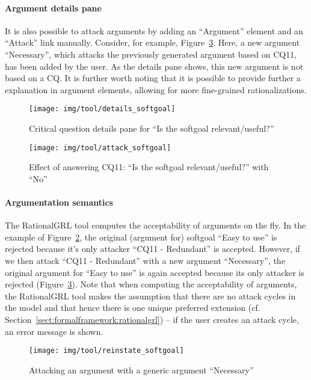 \paragraph{Argument details pane} It is also possible to attack arguments by adding an ``Argument'' element and an ``Attack'' link manually. Consider, for example, Figure~\ref{fig:tool:argument}. Here, a new argument ``Necessary'', which attacks the previously generated argument based on CQ11, has been added by the user. As the details pane shows, this new argument is not based on a CQ. It is further worth noting that it is possible to provide further a explanation in argument elements, allowing for more fine-grained rationalizations. 

\begin{figure}[t]
\centering
\texttt{[image: img/tool/details\_softgoal]}
\caption{Critical question details pane for ``Is the softgoal relevant/useful?''}
\label{fig:tool:cqdetails}
\end{figure}

\begin{figure}[b]
\centering
\texttt{[image: img/tool/attack\_softgoal]}
\caption{Effect of answering CQ11: ``Is the softgoal relevant/useful?'' with ``No''}
\label{fig:tool:cqeffect}
\end{figure}

\paragraph{Argumentation semantics} The RationalGRL tool computes the acceptability of arguments on the fly. In the example of Figure~\ref{fig:tool:cqeffect}, the original (argument for) softgoal ``Easy to use'' is rejected because it's only attacker ``CQ11 - Redundant'' is accepted. However, if we then attack ``CQ11 - Redundant'' with a new argument ``Necessary'', the original argument for ``Easy to use'' is again accepted because its only attacker is rejected  (Figure~\ref{fig:tool:argument}). Note that when computing the acceptability of arguments, the RationalGRL tool makes the assumption that there are no attack cycles in the model and that hence there is one unique preferred extension (cf. Section~\ref{sect:formalframework:rationalgrl}) -- if the user creates an attack cycle, an error message is shown. 

\begin{figure}[t]
\centering
\texttt{[image: img/tool/reinstate\_softgoal]}
\caption{Attacking an argument with a generic argument ``Necessary''}
\label{fig:tool:argument}
\end{figure}

